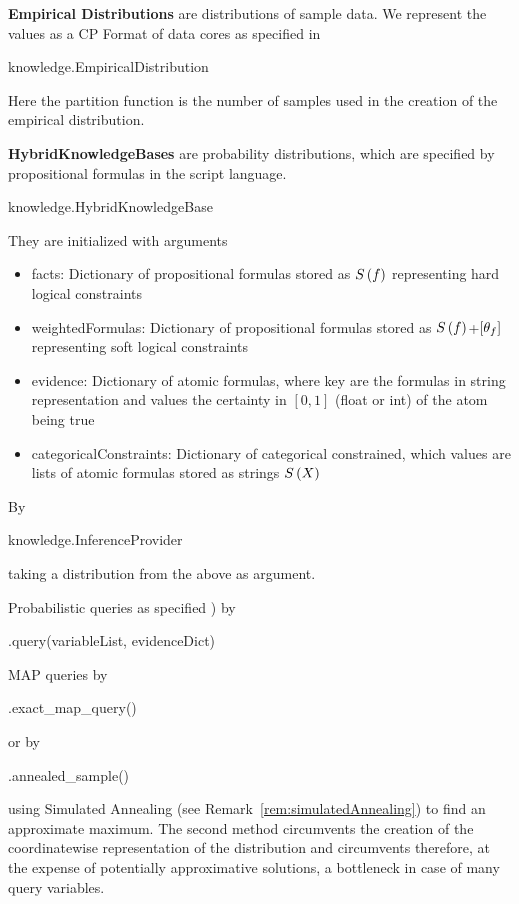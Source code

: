 \textbf{Empirical Distributions} are distributions of sample data.
We represent the values as a CP Format of data cores as specified in 
\begin{centeredcode}
	knowledge.EmpiricalDistribution
\end{centeredcode}
Here the partition function is the number of samples used in the creation of the empirical distribution.


\textbf{HybridKnowledgeBases} are probability distributions, which are specified by propositional formulas in the script language.
\begin{centeredcode}
	knowledge.HybridKnowledgeBase
\end{centeredcode}
They are initialized with arguments
\begin{itemize}
	\item facts: Dictionary of propositional formulas stored as $S\left(f\right)$ representing hard logical constraints
	\item weightedFormulas: Dictionary of propositional formulas stored as $S\left(f\right)$+$[\theta_{f}]$ representing soft logical constraints
	\item evidence: Dictionary of atomic formulas, where key are the formulas in string representation and values the certainty in $[0,1]$ (float or int) of the atom being true
	\item categoricalConstraints: Dictionary of categorical constrained, which values are lists of atomic formulas stored as strings $S\left(X\right)$
\end{itemize}



By
\begin{centeredcode}
	knowledge.InferenceProvider
\end{centeredcode}
taking a distribution from the above as argument.

Probabilistic queries as specified )  by
\begin{centeredcode}
	.query(variableList, evidenceDict)
\end{centeredcode}

MAP queries by
\begin{centeredcode}
	.exact\_map\_query()
\end{centeredcode}
or by
\begin{centeredcode}
	.annealed\_sample()
\end{centeredcode}
using Simulated Annealing (see Remark~\ref{rem:simulatedAnnealing}) to find an approximate maximum.
The second method circumvents the creation of the coordinatewise representation of the distribution and circumvents therefore, at the expense of potentially approximative solutions, a bottleneck in case of many query variables.

